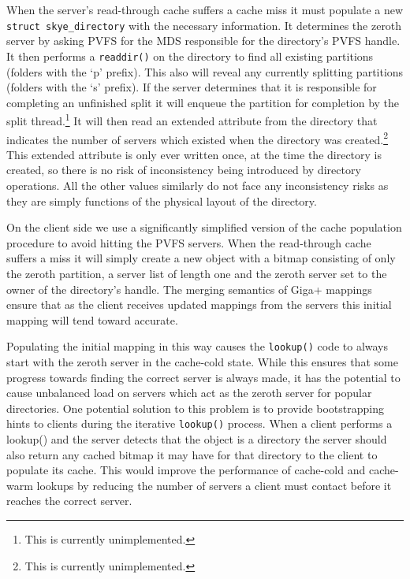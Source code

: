 \documentclass[twocolumn,letterpaper]{article}
\newcommand{\code}[1]{\texttt{#1}}
\begin{document}
When the server's read-through cache suffers a cache miss it must populate a new
\code{struct skye\_\-directory} with the necessary information.  It determines
the zeroth server by asking PVFS for the MDS responsible for the directory's
PVFS handle.  It then performs a \code{readdir()} on the directory to find all
existing partitions (folders with the `p' prefix).  This also will reveal any
currently splitting partitions (folders with the `s' prefix).  If the server
determines that it is responsible for completing an unfinished split it will
enqueue the partition for completion by the split thread.\footnote{This is
currently unimplemented.} It will then read an extended attribute from the
directory that indicates the number of servers which existed when the
directory was created.\footnote{This is currently unimplemented.}  This
extended attribute is only ever written once, at the time the directory is
created, so there is no risk of inconsistency being introduced by directory
operations.  All the other values similarly do not face any inconsistency
risks as they are simply functions of the physical layout of the directory.

On the client side we use a significantly simplified version of the cache
population procedure to avoid hitting the PVFS servers.  When the read-through
cache suffers a miss it will simply create a new object with a bitmap consisting
of only the zeroth partition, a server list of length one and the zeroth server
set to the owner of the directory's handle.  The merging semantics of Giga+
mappings ensure that as the client receives updated mappings from the servers
this initial mapping will tend toward accurate.

Populating the initial mapping in this way causes the \code{lookup()} code to always
start with the zeroth server in the cache-cold state.  While this ensures that
some progress towards finding the correct server is always made, it has the
potential to cause unbalanced load on servers which act as the zeroth server for
popular directories.  One potential solution to this problem is to provide
bootstrapping hints to clients during the iterative \code{lookup()} process.
When a client performs a {lookup()} and the server detects that the object is
a directory the server should also return any cached bitmap it may have for
that directory to the client to populate its cache.  This would improve the
performance of cache-cold and cache-warm lookups by reducing the number of
servers a client must contact before it reaches the correct server. 
\end{document}
